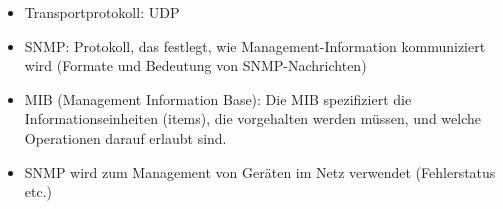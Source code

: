 \begin{itemize}
    \item Transportprotokoll: UDP
    \item SNMP: Protokoll, das festlegt, wie Management-Information kommuniziert wird (Formate und Bedeutung von SNMP-Nachrichten)
    \item MIB (Management Information Base): Die MIB spezifiziert die Informationseinheiten (items), die vorgehalten werden müssen, und welche Operationen darauf erlaubt sind.
    \item SNMP wird zum Management von Geräten im Netz verwendet (Fehlerstatus etc.)
\end{itemize}
